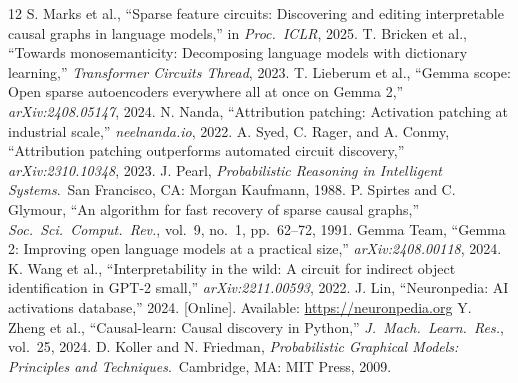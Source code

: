 \documentclass[conference]{IEEEtran}
\begin{document}
\begin{thebibliography}{12}
 S. Marks et al., ``Sparse feature circuits: Discovering and editing interpretable causal graphs in language models,'' in \emph{Proc.\ ICLR}, 2025.
 T. Bricken et al., ``Towards monosemanticity: Decomposing language models with dictionary learning,'' \emph{Transformer Circuits Thread}, 2023.
 T. Lieberum et al., ``Gemma scope: Open sparse autoencoders everywhere all at once on Gemma 2,'' \emph{arXiv:2408.05147}, 2024.
 N. Nanda, ``Attribution patching: Activation patching at industrial scale,'' \emph{neelnanda.io}, 2022.
 A. Syed, C. Rager, and A. Conmy, ``Attribution patching outperforms automated circuit discovery,'' \emph{arXiv:2310.10348}, 2023.
 J. Pearl, \emph{Probabilistic Reasoning in Intelligent Systems}.\ San Francisco, CA: Morgan Kaufmann, 1988.
 P. Spirtes and C. Glymour, ``An algorithm for fast recovery of sparse causal graphs,'' \emph{Soc.\ Sci.\ Comput.\ Rev.}, vol.~9, no.~1, pp.~62--72, 1991.
 Gemma Team, ``Gemma 2: Improving open language models at a practical size,'' \emph{arXiv:2408.00118}, 2024.
 K. Wang et al., ``Interpretability in the wild: A circuit for indirect object identification in GPT-2 small,'' \emph{arXiv:2211.00593}, 2022.
 J. Lin, ``Neuronpedia: AI activations database,'' 2024. [Online]. Available: \url{https://neuronpedia.org}
 Y. Zheng et al., ``Causal-learn: Causal discovery in Python,'' \emph{J.\ Mach.\ Learn.\ Res.}, vol.~25, 2024.
 D. Koller and N. Friedman, \emph{Probabilistic Graphical Models: Principles and Techniques}.\ Cambridge, MA: MIT Press, 2009.
\end{thebibliography}
\end{document}
